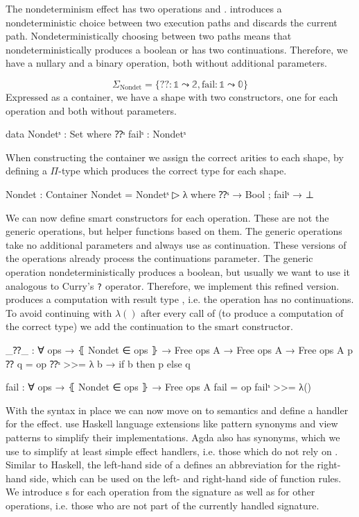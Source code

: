 The nondeterminism effect has two operations  and
.
 introduces a nondeterministic choice between two execution
paths and  discards the current path.
Nondeterministically choosing between two paths means that 
nondeterministically produces a boolean or has two continuations.
Therefore, we have a nullary and a binary operation, both without additional
parameters.

$$
\Sigma_{\text{Nondet}} = \{ ?\!? : \mathbb{1} \leadsto \mathbb{2}, \mathrm{fail}
: \mathbb{1} \leadsto \mathbb{0} \}
$$
Expressed as a container, we have a shape with two constructors, one for each
operation and both without parameters.

\begin{code}
data Nondetˢ : Set where ⁇ˢ failˢ : Nondetˢ
\end{code}
When constructing the container we assign the correct arities to each shape, by
defining a $\Pi$-type which produces the correct type for each shape.

\begin{code}
Nondet : Container
Nondet = Nondetˢ ▷ λ where ⁇ˢ → Bool ; failˢ → ⊥
\end{code}
We can now define smart constructors for each operation.
These are not the generic operations, but helper functions based on them.
The generic operations take no additional parameters and always use
 as continuation.
These versions of the operations already process the continuations parameter.
The generic  operation nondeterministically produces a boolean,
but usually we want to use it analogous to Curry's \texttt{?} operator.
Therefore, we implement this refined version.
\AgdaSpace{} produces a
computation with result type , i.e. the operation has no
continuations.
To avoid continuing with $λ()$ after every call of  (to
produce a computation of the correct type) we add the continuation to the smart
constructor.

\begin{code}
_⁇_ : ∀ {ops} → ⦃ Nondet ∈ ops ⦄ → Free ops A → Free ops A → Free ops A
p ⁇ q = op ⁇ˢ >>= λ b → if b then p else q

fail : ∀ {ops} → ⦃ Nondet ∈ ops ⦄ → Free ops A
fail = op failˢ >>= λ()
\end{code}
With the syntax in place we can now move on to semantics and define a handler
for the effect.
\textcite{DBLP:conf/haskell/WuSH14} use Haskell language extensions like pattern
synonyms and view patterns to simplify their implementations.
Agda also has  synonyms, which we use to simplify at least
simple effect handlers, i.e. those which do not rely on .
Similar to Haskell, the left-hand side of a  defines an
abbreviation for the right-hand side, which can be used on the left- and
right-hand side of function rules.
We introduce s for each operation from the signature as
well as for other operations, i.e. those who are not part of the currently
handled signature.

